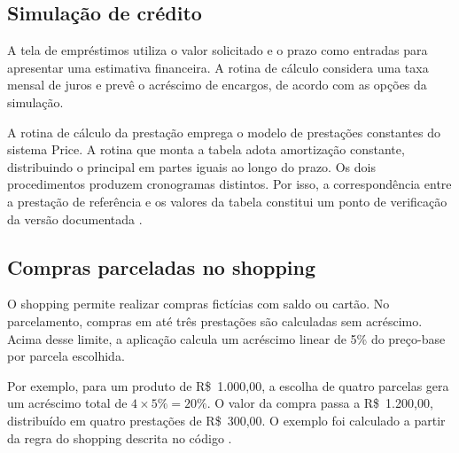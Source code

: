 \subsection{Simulação de crédito}
\label{cap-concepcao-credito}

A tela de empréstimos utiliza o valor solicitado e o prazo como
entradas para apresentar uma estimativa financeira. A rotina de
cálculo considera uma taxa mensal de juros e prevê o acréscimo de
encargos, de acordo com as opções da simulação.

A rotina de cálculo da prestação emprega o modelo de prestações
constantes do sistema Price. A rotina que monta a tabela adota
amortização constante, distribuindo o principal em partes iguais
ao longo do prazo. Os dois procedimentos produzem cronogramas
distintos. Por isso, a correspondência entre a prestação de
referência e os valores da tabela constitui um ponto de
verificação da versão documentada \cite{bravin2026edbank}.

\subsection{Compras parceladas no shopping}
\label{cap-concepcao-shopping}

O shopping permite realizar compras fictícias com saldo ou cartão.
No parcelamento, compras em até três prestações são calculadas sem
acréscimo. Acima desse limite, a aplicação calcula um acréscimo
linear de 5\% do preço-base por parcela escolhida.

Por exemplo, para um produto de \mbox{R\$~1.000,00}, a escolha de
quatro parcelas gera um acréscimo total de \(4 \times 5\% = 20\%\).
O valor da compra passa a \mbox{R\$~1.200,00}, distribuído em
quatro prestações de \mbox{R\$~300,00}. O exemplo foi calculado
a partir da regra do shopping descrita no código
\cite{bravin2026edbank}.